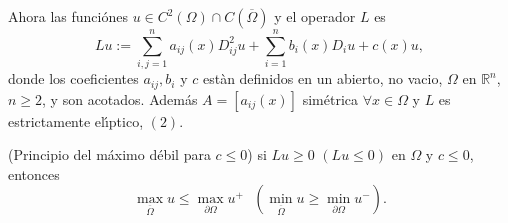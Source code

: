 




Ahora las funci\'{o}nes $u\in C^{2}\left(  \Omega\right)  \cap C\left(
\overline{\Omega}\right)  $ y el operador $L$ es
\begin{equation}
Lu:=\sum_{i,j=1}^{n}a_{ij}\left(  x\right)  D_{ij}^{2}u+\sum_{i=1}^{n}%
b_{i}\left(  x\right)  D_{i}u+c\left(  x\right)  u,\tag{9}%
\end{equation}
donde los coeficientes $a_{ij},b_{i}$ y $c$ est\`{a}n definidos en
un abierto, no vacio, $\Omega$ en $\mathbb{R}^{n}$, $n\geq2$, y
son acotados. Adem\'{a}s $A=\left[  a_{ij}\left(  x\right) \right]
$ sim\'{e}trica $\forall x\in\Omega$ y $L$ es estrictamente
el\'{\i}ptico, $\left(  2\right)  $.

\begin{theorem}
(Principio del m\'{a}ximo d\'{e}bil para $c\leq0$) si $Lu\geq0$ $\left(
Lu\leq0\right)  $ en $\Omega$ y $c\leq0$, entonces
\[
\max_{\overline{\Omega}}u\leq\max_{\partial\Omega}u^{+}\text{ \ }\left(
\min_{\overline{\Omega}}u\geq\min_{\partial\Omega}u^{-}\right)  .
\]

\end{theorem}
